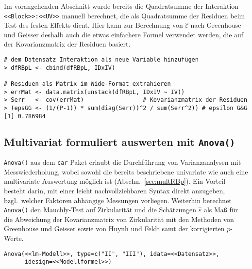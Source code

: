 Im vorangehenden Abschnitt wurde bereits die Quadratsumme der Interaktion \lstinline!<<Block>>:<<UV>>! manuell berechnet, die als Quadratsumme der Residuen beim Test des festen Effekts dient. Hier kann zur Berechnung von $\hat{\varepsilon}$ nach Greenhouse und Geisser deshalb auch die etwas einfachere Formel verwendet werden, die auf der Kovarianzmatrix der Residuen basiert.
\begin{lstlisting}
# dem Datensatz Interaktion als neue Variable hinzufügen
> dfRBpL <- cbind(dfRBpL, IDxIV)

# Residuen als Matrix im Wide-Format extrahieren
> errMat <- data.matrix(unstack(dfRBpL, IDxIV ~ IV))
> Serr   <- cov(errMat)                 # Kovarianzmatrix der Residuen
> (epsGG <- (1/(P-1)) * sum(diag(Serr))^2 / sum(Serr^2)) # epsilon G&G
[1] 0.786984
\end{lstlisting}

\subsection{Multivariat formuliert auswerten mit \texttt{Anova()}}
\label{sec:AnovaRBp}

\lstinline!Anova()! aus dem \lstinline!car! Paket erlaubt die Durchführung von Varianzanalysen mit Messwiederholung, wobei sowohl die bereits beschriebene univariate wie auch eine multivariate Auswertung möglich ist (Abschn.\ \ref{sec:multRBp}). Ein Vorteil besteht darin, mit einer leicht nachvollziehbaren Syntax direkt anzugeben, bzgl.\ welcher Faktoren abhängige Messungen vorliegen. Weiterhin berechnet \lstinline!Anova()! den Mauchly-Test auf Zirkularität und die Schätzungen $\hat{\varepsilon}$ als Maß für die Abweichung der Kovarianzmatrix von Zirkularität mit den Methoden von Greenhouse und Geisser sowie von Huynh und Feldt
 samt der korrigierten $p$-Werte.
\begin{lstlisting}
Anova(<<lm-Modell>>, type=c("II", "III"), idata=<<Datensatz>>,
      idesign=<<Modellformel>>)
\end{lstlisting}

